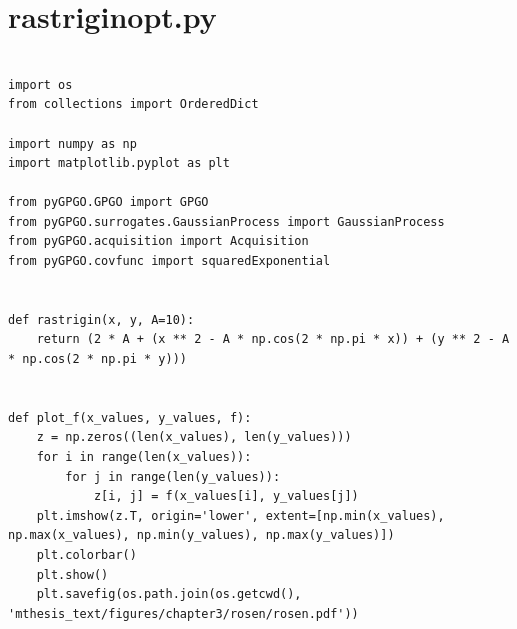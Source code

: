 \documentclass[10pt,a4paper,twoside]{book}
\begin{document}
\begin{appendices}
\begin{verbatim}
\end{verbatim}

\section{rastriginopt.py}
\label{rastriginopt}

\begin{verbatim}
               
import os
from collections import OrderedDict

import numpy as np
import matplotlib.pyplot as plt

from pyGPGO.GPGO import GPGO
from pyGPGO.surrogates.GaussianProcess import GaussianProcess
from pyGPGO.acquisition import Acquisition
from pyGPGO.covfunc import squaredExponential


def rastrigin(x, y, A=10):
    return (2 * A + (x ** 2 - A * np.cos(2 * np.pi * x)) + (y ** 2 - A * np.cos(2 * np.pi * y)))


def plot_f(x_values, y_values, f):
    z = np.zeros((len(x_values), len(y_values)))
    for i in range(len(x_values)):
        for j in range(len(y_values)):
            z[i, j] = f(x_values[i], y_values[j])
    plt.imshow(z.T, origin='lower', extent=[np.min(x_values), np.max(x_values), np.min(y_values), np.max(y_values)])
    plt.colorbar()
    plt.show()
    plt.savefig(os.path.join(os.getcwd(), 'mthesis_text/figures/chapter3/rosen/rosen.pdf'))



\end{verbatim}
\end{appendices}
\end{document}
